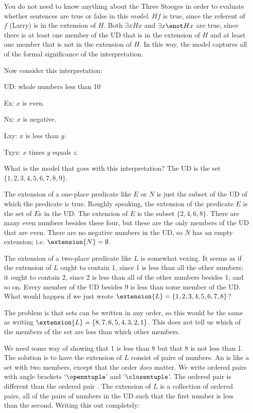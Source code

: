 You do not need to know anything about the Three Stooges in order to evaluate whether sentences are true or false in this \emph{model}. $Hf$ is true, since the referent of $f$ (Larry) is in the extension of $H$. Both $\exists x Hx$ and $\exists x \enot Hx$ are true, since there is at least one member of the UD that is in the extension of $H$ and at least one member that is not in the extension of $H$. In this way, the model captures all of the formal significance of the interpretation.

Now consider this interpretation:
\begin{ekey}
\item{UD:} whole numbers less than 10
\item{Ex:} $x$ is even.
\item{Nx:} $x$ is negative.
\item{Lxy:} $x$ is less than $y$.
\item{Txyz:} $x$ times $y$ equals $z$.
\end{ekey}
What is the model that goes with this interpretation?
The UD is the set $\{1,2,3,4,5,6,7,8,9\}$.

The extension of a one-place predicate like $E$ or $N$ is just the subset of the UD of which the predicate is true. Roughly speaking, the extension of the predicate $E$ is the set of $E$s in the UD.
The extension of $E$ is the subset $\{2,4,6,8\}$. There are many even numbers besides these four, but these are the only members of the UD that are even. There are no negative numbers in the UD, so $N$ has an empty extension; i.e. $\extension{N}=\emptyset$.


The extension of a two-place predicate like $L$ is somewhat vexing. It seems as if the extension of $L$ ought to contain 1, since 1 is less than all the other numbers; it ought to contain 2, since 2 is less than all of the other numbers besides 1; and so on. Every member of the UD besides 9 is less than some member of the UD. What would happen if we just wrote $\extension{L}=\{1,2,3,4,5,6,7,8\}$?

The problem is that sets can be written in any order, so this would be the same as writing $\extension{L}=\{8,7,6,5,4,3,2,1\}$. This does not tell us which of the members of the set are less than which other members.

We need some way of showing that 1 is less than 8 but that 8 is not less than 1. The solution is to have the extension of $L$ consist of pairs of numbers. An  is like a set with two members, except that the order \emph{does} matter. We write ordered pairs with angle brackets `$\openntuple$' and `$\closentuple$'. The ordered pair \mbox{} is different than the ordered pair \mbox{}. The extension of $L$ is a collection of ordered pairs, all of the pairs of numbers in the UD such that the first number is less than the second. Writing this out completely:

